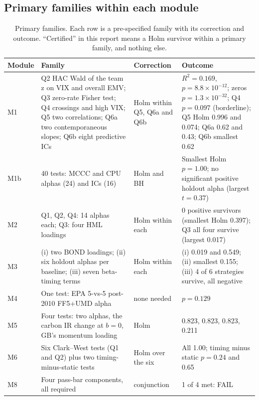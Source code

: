 \subsection{Primary families within each module}
\begin{table}[H]
\caption{Primary families. Each row is a pre-specified family with its correction and outcome. ``Certified'' in this report means a Holm survivor within a primary family, and nothing else.}
\label{tab:families}
\centering\footnotesize
\setlength{\tabcolsep}{4pt}
\begin{tabularx}{\textwidth}{@{}L{1.2cm}YL{2.2cm}Y@{}}
\toprule
Module & Family & Correction & Outcome \\
\midrule
M1 & Q2 HAC Wald of the team z on VIX and overall EMV; Q3 zero-rate Fisher test; Q4 crossings and high VIX; Q5 two correlations; Q6a two contemporaneous slopes; Q6b eight predictive ICs & Holm within Q5, Q6a and Q6b & $R^2=0.169$, $p=8.8\times10^{-12}$; zeros $p=1.3\times10^{-32}$; Q4 $p=0.097$ (borderline); Q5 Holm 0.996 and 0.074; Q6a 0.62 and 0.43; Q6b smallest 0.62 \\
M1b & 40 tests: MCCC and CPU alphas (24) and ICs (16) & Holm and BH & Smallest Holm $p=1.00$; no significant positive holdout alpha (largest $t=0.37$) \\
M2 & Q1, Q2, Q4: 14 alphas each; Q3: four HML loadings & Holm within each & 0 positive survivors (smallest Holm 0.397); Q3 all four survive (largest 0.017) \\
M3 & (i) two BOND loadings; (ii) six holdout alphas per baseline; (iii) seven beta-timing terms & Holm within each & (i) 0.019 and 0.549; (ii) smallest 0.155; (iii) 4 of 6 strategies survive, all negative \\
M4 & One test: EPA 5-vs-5 post-2010 FF5+UMD alpha & none needed & $p=0.129$ \\
M5 & Four tests: two alphas, the carbon IR change at $b=0$, GB's momentum loading & Holm & 0.823, 0.823, 0.823, 0.211 \\
M6 & Six Clark--West tests (Q1 and Q2) plus two timing-minus-static tests & Holm over the six & All 1.00; timing minus static $p=0.24$ and 0.65 \\
M8 & Four pass-bar components, all required & conjunction & 1 of 4 met: FAIL \\
\bottomrule
\end{tabularx}
\end{table}

